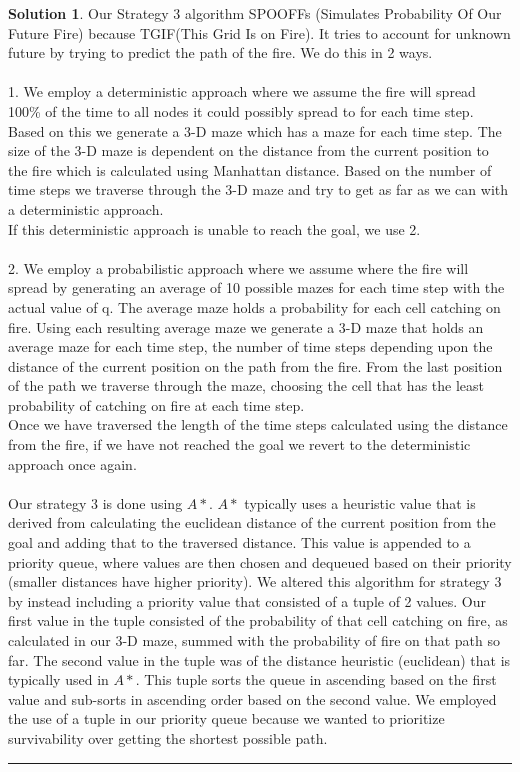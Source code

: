 \documentclass{article}
\theoremstyle{definition}
\def\fline{\rule{0.75\linewidth}{0.5pt}}
\newcommand{\finishline}{\vspace{-15pt}\begin{center}\fline\end{center}}
\newtheorem*{solution*}{Solution}
\newenvironment{solution}{\begin{solution*}}{{\finishline} \end{solution*}}
\begin{document}
\begin{solution}

	Our Strategy 3 algorithm SPOOFFs (Simulates Probability Of Our Future Fire) because TGIF(This Grid Is on Fire). It tries to account for unknown future by trying to predict the path of the fire. We do this in 2 ways. 
    \\\\
	1. We employ a deterministic approach where we assume the fire will spread 100\% of the time to all nodes it could possibly spread to for each time step. Based on this we generate a 3-D maze which has a maze for each time step. The size of the 3-D maze is dependent on the distance from the current position to the fire which is calculated using Manhattan distance. Based on the number of time steps we traverse through the 3-D maze and try to get as far as we can with a deterministic approach. 
	\\
	If this deterministic approach is unable to reach the goal, we use 2. 
	\\\\
	2. We employ a probabilistic approach where we assume where the fire will spread by generating an average of 10 possible mazes for each time step with the actual value of q. The average maze holds a probability for each cell catching on fire. Using each resulting average maze we generate a 3-D maze that holds an average maze for each time step, the number of time steps depending upon the distance of the current position on the path from the fire. From the last position of the path we traverse through the maze, choosing the cell that has the least probability of catching on fire at each time step.
	\\ 
	Once we have traversed the length of the time steps calculated using the distance from the fire, if we have not reached the goal we revert to the deterministic approach once again.
	\\\\
	Our strategy 3 is done using $A*$. $A*$ typically uses a heuristic value that is derived from calculating the euclidean distance of the current position from the goal and adding that to the traversed distance. This value is appended to a priority queue, where values are then chosen and dequeued based on their priority (smaller distances have higher priority). We altered this algorithm for strategy 3 by instead including a priority value that consisted of a tuple of 2 values. Our first value in the tuple consisted of the probability of that cell catching on fire, as calculated in our 3-D maze, summed with the probability of fire on that path so far. The second value in the tuple was of the distance heuristic (euclidean) that is typically used in $A*$. This tuple sorts the queue in ascending based on the first value and sub-sorts in ascending order based on the second value. We employed the use of a tuple in our priority queue because we wanted to prioritize survivability over getting the shortest possible path. 

\end{solution}
\end{document}
